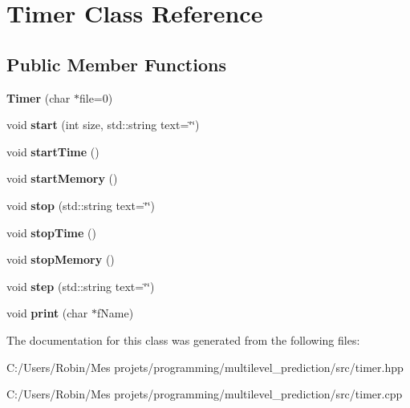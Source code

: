 \hypertarget{class_timer}{}\section{Timer Class Reference}
\label{class_timer}
\subsection*{Public Member Functions}
\begin{DoxyCompactItemize}
\item 
\hypertarget{class_timer_a14edf0bdfc5a214895d321e7ae69365b}{}{\bfseries Timer} (char $\ast$file=0)\label{class_timer_a14edf0bdfc5a214895d321e7ae69365b}

\item 
\hypertarget{class_timer_acc61f0c4f2c1e26ba0bb62d367f0977e}{}void {\bfseries start} (int size, std\+::string text=\char`\"{}\char`\"{})\label{class_timer_acc61f0c4f2c1e26ba0bb62d367f0977e}

\item 
\hypertarget{class_timer_a5771baafd265be353ab78a4bb77329f9}{}void {\bfseries start\+Time} ()\label{class_timer_a5771baafd265be353ab78a4bb77329f9}

\item 
\hypertarget{class_timer_afada34fd58fb4729b9a6ee7a445f5133}{}void {\bfseries start\+Memory} ()\label{class_timer_afada34fd58fb4729b9a6ee7a445f5133}

\item 
\hypertarget{class_timer_afc259e85201ab94f291b36ed97dbd5e2}{}void {\bfseries stop} (std\+::string text=\char`\"{}\char`\"{})\label{class_timer_afc259e85201ab94f291b36ed97dbd5e2}

\item 
\hypertarget{class_timer_a71c4bba47ccad8ed4131922d1cd6d689}{}void {\bfseries stop\+Time} ()\label{class_timer_a71c4bba47ccad8ed4131922d1cd6d689}

\item 
\hypertarget{class_timer_a55ad7a96c2e75c4a1a7209c8eb89ee9d}{}void {\bfseries stop\+Memory} ()\label{class_timer_a55ad7a96c2e75c4a1a7209c8eb89ee9d}

\item 
\hypertarget{class_timer_a88fa29d9f2422df0ad2ed43b1c28cc04}{}void {\bfseries step} (std\+::string text=\char`\"{}\char`\"{})\label{class_timer_a88fa29d9f2422df0ad2ed43b1c28cc04}

\item 
\hypertarget{class_timer_af29968e93e56c8bf1de7c9f559dfae23}{}void {\bfseries print} (char $\ast$f\+Name)\label{class_timer_af29968e93e56c8bf1de7c9f559dfae23}

\end{DoxyCompactItemize}


The documentation for this class was generated from the following files\+:\begin{DoxyCompactItemize}
\item 
C\+:/\+Users/\+Robin/\+Mes projets/programming/multilevel\+\_\+prediction/src/timer.\+hpp\item 
C\+:/\+Users/\+Robin/\+Mes projets/programming/multilevel\+\_\+prediction/src/timer.\+cpp\end{DoxyCompactItemize}
